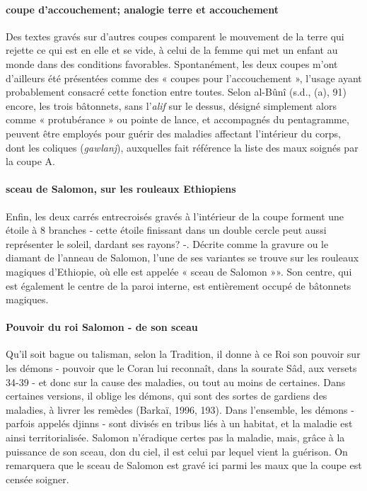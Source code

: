 \paragraph{coupe d'accouchement; analogie terre et accouchement  }
Des textes gravés sur d'autres coupes comparent le mouvement de la terre qui rejette ce qui est en elle et se vide, à celui de la femme qui met un enfant au monde dans des conditions favorables. Spontanément, les deux coupes m'ont d'ailleurs été présentées comme des « coupes pour l'accouchement », l'usage ayant probablement consacré cette fonction entre toutes. Selon al-Bûnî (s.d., (a), 91) encore, les trois bâtonnets, sans l'\textit{alif} sur le dessus, désigné simplement alors comme « protubérance » ou pointe de lance, et accompagnés du pentagramme, peuvent être employés pour guérir des maladies affectant l'intérieur du corps, dont les coliques (\textit{gawlanj}), auxquelles fait référence la liste des maux soignés par la coupe A. 
\paragraph{sceau de Salomon, sur les rouleaux Ethiopiens}
Enfin, les deux carrés entrecroisés gravés à l'intérieur de la coupe forment une étoile à 8 branches - cette étoile finissant dans un double cercle peut aussi représenter le soleil, dardant ses rayons? -. Décrite comme la gravure ou le diamant de l'anneau de Salomon, l'une de ses variantes se trouve sur les rouleaux magiques d'Ethiopie, où elle est appelée « sceau de Salomon »». Son centre, qui est également le centre de la paroi interne, est entièrement occupé de bâtonnets magiques. 
\paragraph{Pouvoir du roi Salomon - de son sceau}
Qu'il soit bague ou talisman, selon la Tradition, il donne à ce Roi son pouvoir sur les démons
-  pouvoir que le Coran lui reconnaît, dans la sourate Sâd, aux versets 34-39 - et donc sur la cause des maladies, ou tout au moins de certaines.
Dans certaines versions, il oblige les démons, qui sont des sortes de gardiens des maladies, à livrer les remèdes (Barkaï, 1996, 193). Dans l'ensemble, les démons - parfois appelés djinns - sont divisés en tribus liés à un habitat, et la maladie est ainsi territorialisée. Salomon n'éradique certes pas la maladie, mais, grâce à la puissance de son sceau, don du ciel, il est celui par lequel vient la guérison. On remarquera que le sceau de Salomon est gravé ici parmi les maux que la coupe est censée soigner.

